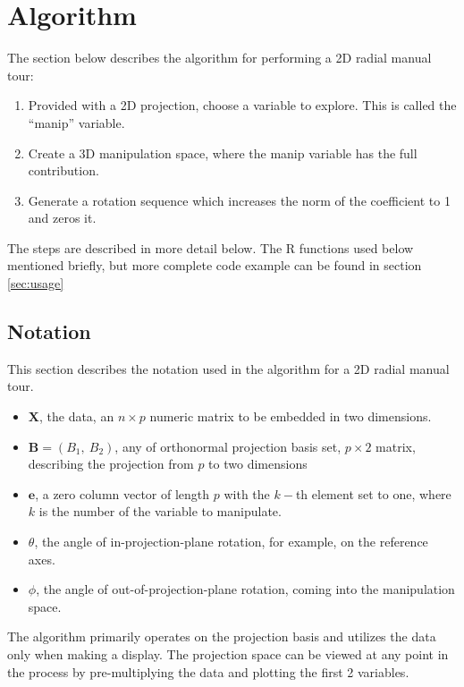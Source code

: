 \documentclass{monashthesis}
\theoremstyle{definition}
\theoremstyle{definition}
\theoremstyle{definition}
\theoremstyle{remark}
\begin{document}
\section{Algorithm}\label{sec:algorithm}

The section below describes the algorithm for performing a 2D radial
manual tour:

\begin{enumerate}
\def\labelenumi{\arabic{enumi}.}
\tightlist
\item
  Provided with a 2D projection, choose a variable to explore. This is
  called the ``manip'' variable.
\item
  Create a 3D manipulation space, where the manip variable has the full
  contribution.
\item
  Generate a rotation sequence which increases the norm of the
  coefficient to 1 and zeros it.
\end{enumerate}

The steps are described in more detail below. The R functions used below
mentioned briefly, but more complete code example can be found in
section \ref{sec:usage}

\subsection{Notation}\label{notation}

This section describes the notation used in the algorithm for a 2D
radial manual tour.

\begin{itemize}
  \item $\textbf{X}$, the data, an $n \times p$ numeric matrix to be embedded in two dimensions.
  \item $\textbf{B} = (B_1,~ B_2)$, any of orthonormal projection basis set, $p \times 2$ matrix, describing the projection from $p$ to two dimensions
  \item $\textbf{e}$, a zero column vector of length $p$ with the $k-$th element set to one, where $k$ is the number of the variable to manipulate.
  \item $\theta$, the angle of in-projection-plane rotation, for example, on the reference axes. 
  \item $\phi$, the angle of out-of-projection-plane rotation, coming into the manipulation space.
\end{itemize}

The algorithm primarily operates on the projection basis and utilizes
the data only when making a display. The projection space can be viewed
at any point in the process by pre-multiplying the data and plotting the
first 2 variables.
\end{document}
